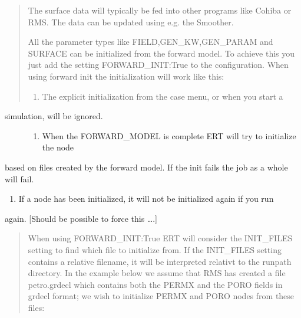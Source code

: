 \documentclass[letterpaper,10pt,english]{sphinxmanual}
\begin{document}
\begin{sphinxShadowBox}
\begin{quote}
The surface data will typically be fed into other programs like Cohiba or RMS.
The data can be updated using e.g. the Smoother.


All the parameter types like FIELD,GEN\_KW,GEN\_PARAM and SURFACE can be
initialized from the forward model. To achieve this you just add the setting
FORWARD\_INIT:True to the configuration. When using forward init the
initialization will work like this:
\begin{enumerate}
\item {} 
The explicit initialization from the case menu, or when you start a

\end{enumerate}
\end{quote}
\begin{description}
\item[{simulation, will be ignored.}] \leavevmode\begin{enumerate}
\item {} 
When the FORWARD\_MODEL is complete ERT will try to initialize the node

\end{enumerate}

\end{description}

based on files created by the forward model. If the init fails the job as a
whole will fail.
\begin{enumerate}
\item {} 
If a node has been initialized, it will not be initialized again if you run

\end{enumerate}

again. {[}Should be possible to force this ….{]}
\begin{quote}

When using FORWARD\_INIT:True ERT will consider the INIT\_FILES setting to find
which file to initialize from. If the INIT\_FILES setting contains a relative
filename, it will be interpreted relativt to the runpath directory. In the
example below we assume that RMS has created a file petro.grdecl which
contains both the PERMX and the PORO fields in grdecl format; we wish to
initialize PERMX and PORO nodes from these files:

%
\begin{sphinxVerbatim}[commandchars=\\\{\}]
                
              
\end{sphinxVerbatim}


\end{quote}
\end{sphinxShadowBox}
\end{document}

